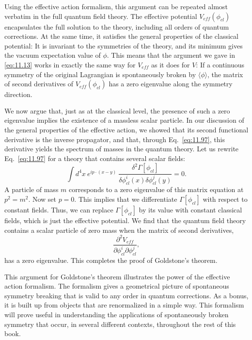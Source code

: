 Using the effective action formalism, this argument can be repeated almost
verbatim in the full quantum field theory.  The effective potential
$V_{eff}(\phi_{cl})$ encapsulates the full solution to the theory, including
all orders of quantum corrections.  At the same time, it satisfies the general
properties of the classical potential: It is invariant to the symmetries of
the theory, and its minimum gives the vacuum expectation value of $\phi$.
This means that the argument we gave in \eqref{eq:11.13} works in exactly the
same way for $V_{eff}$ as it does for $V$: If a continuous symmetry of the
original Lagrangian is spontaneously broken by $\langle\phi\rangle$, the
matrix of second derivatives of $V_{eff}(\phi_{cl})$ has a zero eigenvalue
along the symmetry direction.

We now argue that, just as at the classical level, the presence of such a zero
eigenvalue implies the existence of a massless scalar particle.  In our
discussion of the general properties of the effective action, we showed that
its second functional derivative is the inverse propagator, and that, through
Eq.~\eqref{eq:11.97}, this derivative yields the spectrum of masses in the
quantum theory.  Let us rewrite Eq.~\eqref{eq:11.97} for a theory that
contains several scalar fields:
\begin{equation}
  \int d^4x\ e^{ip\cdot(x-y)}\ \frac{\delta^2\Gamma[\phi_{cl}]}
    {\delta\phi^i_{cl}(x)\delta\phi^j_{cl}(y)} = 0 .
  \label{eq:11.105}
\end{equation}
A particle of mass $m$ corresponds to a zero eigenvalue of this matrix
equation at $p^2 = m^2$.  Now set $p = 0$.  This implies that we
differentiate $\Gamma[\phi_{cl}]$ with respect to constant fields.  Thus, we
can replace $\Gamma[\phi_{cl}]$ by its value with constant classical fields,
which is just the effective potential.  We find that the quantum field theory
contains a scalar particle of zero mass when the matrix of second derivatives,
\begin{equation}
  \frac{\partial^2 V_{eff}}{\partial\phi^i_{cl}\partial\phi^j_{cl}} ,
\end{equation}
has a zero eigenvalue.  This completes the proof of Goldstone's theorem.

This argument for Goldstone's theorem illustrates the power of the effective
action formalism.  The formalism gives a geometrical picture of spontaneous
symmetry breaking that is valid to any order in quantum corrections.  As a
bonus, it is built up from objects that are renormalized in a simple way.
This formalism will prove useful in understanding the applications of
spontaneously broken symmetry that occur, in several different contexts,
throughout the rest of this book.

